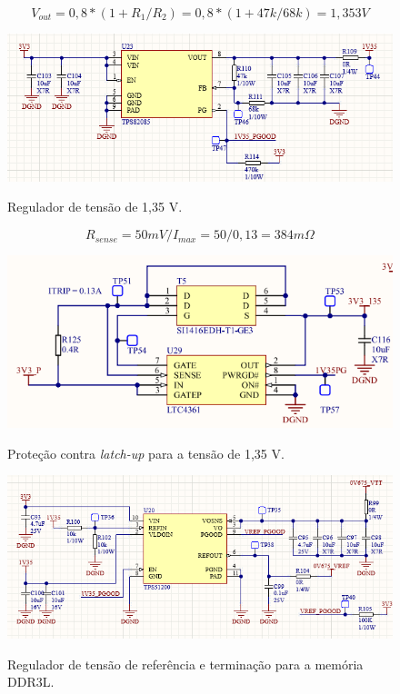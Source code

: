 \begin{equation}
	V_{out} = 0,8 * (1 + R_1/R_2) = 0,8 * (1+ 47k/68k) = 1,353 V
\end{equation} 

\begin{figure}[H]
    \centering
    \caption{Regulador de tensão de 1,35 V.}
    \includegraphics[scale=0.8]{images/1v35supp.png}
    \label{fig:1v35supp}
\end{figure}

\begin{equation}
	R_{sense} = 50 mV / I_{max} =50 / 0,13 = 384 m\Omega
\end{equation} 

\begin{figure}[H]
    \centering
    \caption{Proteção contra \textit{latch-up} para a tensão de 1,35 V.}
    \includegraphics[scale=0.8]{images/1v35ocp.png}
    \label{fig:1v35ocp}
\end{figure}


\begin{figure}[H]
    \centering
    \caption{Regulador de tensão de referência e terminação para a memória DDR3L.}
    \includegraphics[scale=0.8]{images/refsupp.png}
    \label{fig:1v35ref}
\end{figure}

